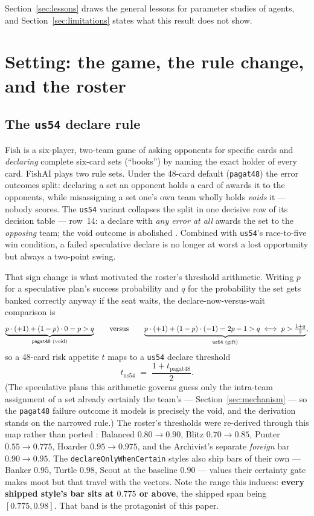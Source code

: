 \documentclass[11pt]{article}
\newcommand{\code}[1]{\texttt{#1}}
\begin{document}
Section~\ref{sec:lessons} draws the general lessons for parameter studies of agents, and
Section~\ref{sec:limitations} states what this result does not show.

\section{Setting: the game, the rule change, and the roster}
\label{sec:setting}

\subsection{The \code{us54} declare rule}

Fish is a six-player, two-team game of asking opponents for specific cards and \emph{declaring}
complete six-card sets (``books'') by naming the exact holder of every card. FishAI plays two
rule sets. Under the 48-card default (\code{pagat48}) the error outcomes split: declaring a set
an opponent holds a card of awards it to the opponents, while misassigning a set one's own team
wholly holds \emph{voids} it --- nobody scores. The \code{us54} variant collapses the split in one
decisive row of its decision table --- row~14: a declare with \emph{any error at all} awards the
set to the \emph{opposing} team; the void outcome is abolished \cite{rules}. Combined with
\code{us54}'s race-to-five win condition, a failed speculative declare is no longer at worst a
lost opportunity but always a two-point swing.

That sign change is what motivated the roster's threshold arithmetic. Writing $p$ for a
speculative plan's success probability and $q$ for the probability the set gets banked correctly
anyway if the seat waits, the declare-now-versus-wait comparison is
\begin{equation*}
\underbrace{p \cdot (+1) + (1-p)\cdot 0 = p > q}_{\text{\code{pagat48} (void)}}
\qquad\text{versus}\qquad
\underbrace{p \cdot (+1) + (1-p)\cdot(-1) = 2p - 1 > q
  \;\Longleftrightarrow\; p > \tfrac{1+q}{2}}_{\text{\code{us54} (gift)}},
\end{equation*}
so a 48-card risk appetite $t$ maps to a \code{us54} declare threshold
\begin{equation}
t_{\mathrm{us54}} \;=\; \frac{1 + t_{\mathrm{pagat48}}}{2}.
\label{eq:map}
\end{equation}
(The speculative plans this arithmetic governs guess only the intra-team assignment of a set
already certainly the team's --- Section~\ref{sec:mechanism} --- so the \code{pagat48} failure
outcome it models is precisely the void, and the derivation stands on the narrowed rule.)
The roster's thresholds were re-derived through this map rather than ported \cite{roster}:
Balanced $0.80 \to 0.90$, Blitz $0.70 \to 0.85$, Punter $0.55 \to 0.775$, Hoarder
$0.95 \to 0.975$, and the Archivist's separate \emph{foreign} bar $0.90 \to 0.95$. The
\code{declareOnlyWhenCertain} styles also ship bars of their own --- Banker $0.95$, Turtle
$0.98$, Scout at the baseline $0.90$ --- values their certainty gate makes moot but that travel
with the vectors. Note the range this induces: \textbf{every shipped style's bar sits at
$0.775$ or above}, the shipped span being $[0.775, 0.98]$. That band is the protagonist of
this paper.
\end{document}
